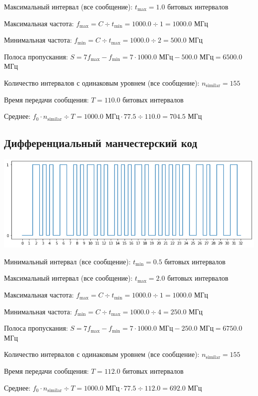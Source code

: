 Максимальный интервал (все сообщение): $t_\mathrm{max}=1.0$ битовых интервалов

Максимальная частота: $f_\mathrm{max}=C\div t_\mathrm{min}=1000.0\div 1=1000.0$ МГц

Минимальная частота: $f_\mathrm{min}=C\div t_\mathrm{max}=1000.0\div 2=500.0$ МГц

Полоса пропускания: $S=7f_\mathrm{max}-f_\mathrm{min} = 7\cdot 1000.0\text{ МГц}-500.0\text{ МГц}=6500.0$ МГц

Количество интервалов с одинаковым уровнем (все сообщение): $n_\mathrm{similar}=155$

Время передачи сообщения: $T=110.0$ битовых интервалов

Среднее: $f_0\cdot n_\mathrm{similar}\div T=1000.0\text{ МГц}\cdot 77.5\div 110.0=704.5$ МГц

\subsection{Дифференциальный манчестерский код}
\includegraphics[width=\textwidth]{2manchester_diff}

Минимальный интервал (все сообщение): $t_\mathrm{min}=0.5$ битовых интервалов

Максимальный интервал (все сообщение): $t_\mathrm{max}=2.0$ битовых интервалов

Максимальная частота: $f_\mathrm{max}=C\div t_\mathrm{min}=1000.0\div 1=1000.0$ МГц

Минимальная частота: $f_\mathrm{min}=C\div t_\mathrm{max}=1000.0\div 4=250.0$ МГц

Полоса пропускания: $S=7f_\mathrm{max}-f_\mathrm{min} = 7\cdot 1000.0\text{ МГц}-250.0\text{ МГц}=6750.0$ МГц

Количество интервалов с одинаковым уровнем (все сообщение): $n_\mathrm{similar}=155$

Время передачи сообщения: $T=112.0$ битовых интервалов

Среднее: $f_0\cdot n_\mathrm{similar}\div T=1000.0\text{ МГц}\cdot 77.5\div 112.0=692.0$ МГц

